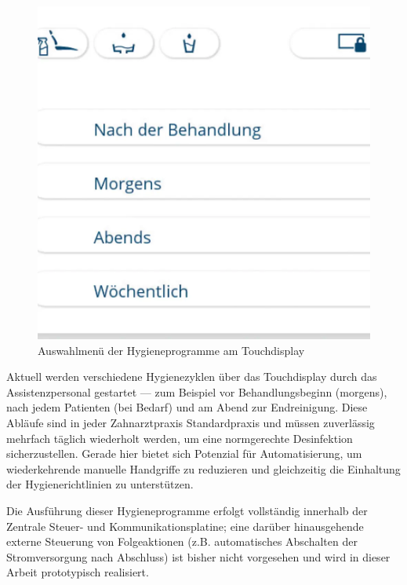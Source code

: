 \vspace{1em}
\begin{figure}[H]
  \centering
  \begin{minipage}[b]{0.7\textwidth}
    \centering
    \includegraphics[width=\textwidth]{images/KaVo-amiQa-Display-Behandlung_de.png}
  \end{minipage}
  \hspace{0.05\textwidth}
  \caption{Auswahlmenü der Hygieneprogramme am Touchdisplay}
  \label{fig: Hygieneprogramme am Touchdisplay}
\end{figure}
\vspace{1em}

Aktuell werden verschiedene Hygienezyklen über das Touchdisplay durch das Assistenzpersonal gestartet — zum Beispiel vor Behandlungsbeginn (morgens), nach jedem Patienten (bei Bedarf) und am Abend zur Endreinigung. Diese Abläufe sind in jeder Zahnarztpraxis Standardpraxis und müssen zuverlässig mehrfach täglich wiederholt werden, um eine normgerechte Desinfektion sicherzustellen. Gerade hier bietet sich Potenzial für Automatisierung, um wiederkehrende manuelle Handgriffe zu reduzieren und gleichzeitig die Einhaltung der Hygienerichtlinien zu unterstützen.

Die Ausführung dieser Hygieneprogramme erfolgt vollständig innerhalb der Zentrale Steuer- und Kommunikationsplatine; eine darüber hinausgehende externe Steuerung von Folgeaktionen (z.B. automatisches Abschalten der Stromversorgung nach Abschluss) ist bisher nicht vorgesehen und wird in dieser Arbeit prototypisch realisiert.

